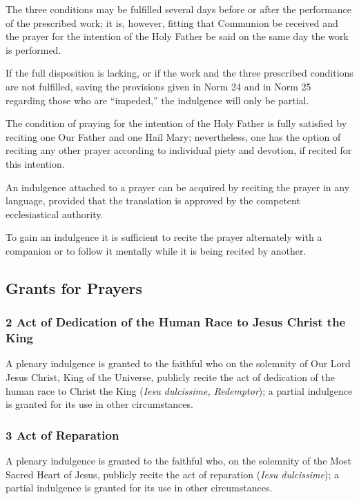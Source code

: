 \documentclass[12pt]{article}
\newcommand{\foreign}[1]{\textsl{#1}}
\begin{document}
 The three conditions may be fulfilled several days before or after the performance of the prescribed work;
it is, however, fitting that Communion be received and the prayer for the intention of the Holy Father be said on the same day the work is performed.

 If the full disposition is lacking, or if the work and the three prescribed conditions are not fulfilled, saving the provisions given in Norm 24 and in Norm 25 regarding those who are ``impeded,'' the indulgence will only be partial.

 The condition of praying for the intention of the Holy Father is fully satisfied by reciting one Our Father and one Hail Mary;
nevertheless, one has the option of reciting any other prayer according to individual piety and devotion, if recited for this intention.

 An indulgence attached to a prayer can be acquired by reciting the prayer in any language, provided that the translation is approved by the competent ecclesiastical authority.

 To gain an indulgence it is sufficient to recite the prayer alternately with a companion or to follow it mentally while it is being recited by another.

\subsection{Grants for Prayers}
\newcommand{\grant}[2]{\subsubsection*{#1 #2}}
\newcommand{\subgrant}[1]{§#1.}
\newcommand{\subsubgrant}[1]{#1$^\circ$}
\hypertarget{grant2}{\grant{2}{Act of Dedication of the Human Race to Jesus Christ the King}}
A plenary indulgence is granted to the faithful who on the solemnity of Our Lord Jesus Christ, King of the Universe, publicly recite the act of dedication of the human race to Christ the King (\foreign{Iesu dulcissime, Redemptor});
a partial indulgence is granted for its use in other circumstances.

\hypertarget{grant3}{\grant{3}{Act of Reparation}}
A plenary indulgence is granted to the faithful who, on the solemnity of the Most Sacred Heart of Jesus, publicly recite the act of reparation (\foreign{Iesu dulcissime}); a partial indulgence is granted for its use in other circumstances.
\end{document}

